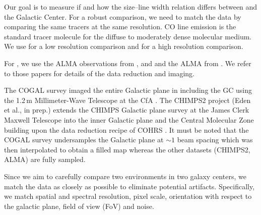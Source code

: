 Our goal is to measure if and how the size--line width relation differs between  and the Galactic Center. For a robust comparison, we need to match the data by comparing the same tracers at the same resolution. CO line emission is the standard tracer molecule for the diffuse to moderately dense molecular medium. We use  for a low resolution comparison and  for a high resolution comparison.

For , we use the ALMA  observations from \citet{2013Natur.499..450B}, \citet{Leroy:2015ds} and \citet{2015ApJ...801...63M} and the ALMA  from \citet{2019ApJ...881...43K}. We refer to those papers for details of the data reduction and imaging. 

The \textsc{COGAL} survey imaged the entire Galactic plane in  including the GC using the 1.2\,m Millimeter-Wave Telescope at the CfA \citep{2001ApJ...547..792D}. The \textsc{CHIMPS2} project (Eden et al., in prep.) extends the \textsc{CHIMPS}  Galactic plane survey \citep{2016MNRAS.456.2885R} at the James Clerk Maxwell Telescope into the inner Galactic plane and the Central Molecular Zone building upon the data reduction recipe of COHRS \citep[CO high-resolution survey of the Galactic plane;][]{2013ApJS..209....8D}.
It must be noted that the  COGAL survey undersamples the Galactic plane at $\sim 1$ beam spacing which was then interpolated to obtain a filled map whereas the other datasets (CHIMPS2,  ALMA) are fully sampled.

Since we aim to carefully compare two environments in two galaxy centers, we match the data as closely as possible to eliminate potential artifacts. Specifically, we match spatial and spectral resolution, pixel scale, orientation with respect to the galactic plane, field of view (FoV) and noise.

